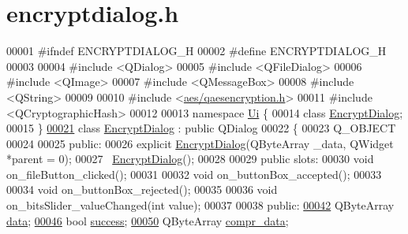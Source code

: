 \hypertarget{encryptdialog_8h_source}{}\section{encryptdialog.\+h}
\label{encryptdialog_8h_source}

\begin{DoxyCode}
00001 \textcolor{preprocessor}{#ifndef ENCRYPTDIALOG\_H}
00002 \textcolor{preprocessor}{#define ENCRYPTDIALOG\_H}
00003 
00004 \textcolor{preprocessor}{#include <QDialog>}
00005 \textcolor{preprocessor}{#include <QFileDialog>}
00006 \textcolor{preprocessor}{#include <QImage>}
00007 \textcolor{preprocessor}{#include <QMessageBox>}
00008 \textcolor{preprocessor}{#include <QString>}
00009 
00010 \textcolor{preprocessor}{#include <\hyperlink{qaesencryption_8h}{aes/qaesencryption.h}>}
00011 \textcolor{preprocessor}{#include <QCryptographicHash>}
00012 
00013 \textcolor{keyword}{namespace }\hyperlink{namespace_ui}{Ui} \{
00014 \textcolor{keyword}{class }\hyperlink{class_encrypt_dialog}{EncryptDialog};
00015 \}
\hypertarget{encryptdialog_8h_source.tex_l00021}{}\hyperlink{class_encrypt_dialog}{00021} \textcolor{keyword}{class }\hyperlink{class_encrypt_dialog}{EncryptDialog} : \textcolor{keyword}{public} QDialog
00022 \{
00023     Q\_OBJECT
00024 
00025 \textcolor{keyword}{public}:
00026     \textcolor{keyword}{explicit} \hyperlink{class_encrypt_dialog}{EncryptDialog}(QByteArray \_data, QWidget *parent = 0);
00027     ~\hyperlink{class_encrypt_dialog}{EncryptDialog}();
00028 
00029 \textcolor{keyword}{public} slots:
00030     \textcolor{keywordtype}{void} on\_fileButton\_clicked();
00031 
00032     \textcolor{keywordtype}{void} on\_buttonBox\_accepted();
00033 
00034     \textcolor{keywordtype}{void} on\_buttonBox\_rejected();
00035 
00036     \textcolor{keywordtype}{void} on\_bitsSlider\_valueChanged(\textcolor{keywordtype}{int} value);
00037 
00038 \textcolor{keyword}{public}:
\hypertarget{encryptdialog_8h_source.tex_l00042}{}\hyperlink{class_encrypt_dialog_acf3a8bbce90d99ef17fec093c35b1008}{00042}     QByteArray \hyperlink{class_encrypt_dialog_acf3a8bbce90d99ef17fec093c35b1008}{data};
\hypertarget{encryptdialog_8h_source.tex_l00046}{}\hyperlink{class_encrypt_dialog_ada4900bcd40894d9c098c65aa4066ac9}{00046}     \textcolor{keywordtype}{bool} \hyperlink{class_encrypt_dialog_ada4900bcd40894d9c098c65aa4066ac9}{success};
\hypertarget{encryptdialog_8h_source.tex_l00050}{}\hyperlink{class_encrypt_dialog_a3e8998aa39696cbd1242f6420ef18143}{00050}     QByteArray \hyperlink{class_encrypt_dialog_a3e8998aa39696cbd1242f6420ef18143}{compr\_data};

\end{DoxyCode}
